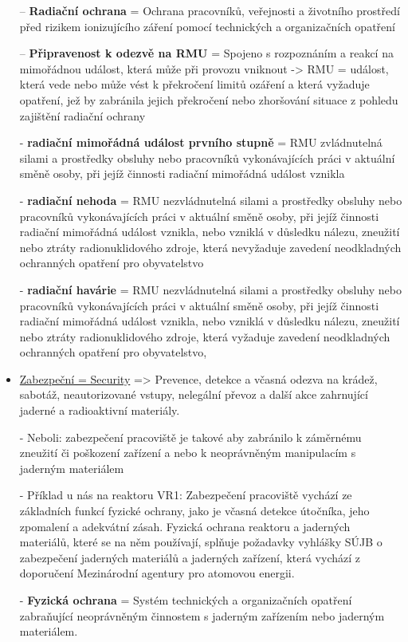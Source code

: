 \begin{itemize}
    \noindent --	\textbf{Radiační ochrana} = Ochrana pracovníků, veřejnosti a životního prostředí před rizikem ionizujícího záření pomocí technických a organizačních opatření


    \noindent --	\textbf{Připravenost k odezvě na RMU} = Spojeno s rozpoznáním a reakcí na mimořádnou událost, která může při provozu vniknout ->  RMU = událost, která vede nebo může vést k překročení limitů ozáření a která vyžaduje opatření, jež by zabránila jejich překročení nebo zhoršování situace z pohledu zajištění radiační ochrany

    - \textbf{radiační mimořádná událost prvního stupně} = RMU zvládnutelná silami a prostředky obsluhy nebo pracovníků vykonávajících práci v aktuální směně osoby, při jejíž činnosti radiační mimořádná událost vznikla

- \textbf{radiační nehoda} = RMU nezvládnutelná silami a prostředky obsluhy nebo pracovníků vykonávajících práci v aktuální směně osoby, při jejíž činnosti radiační mimořádná událost vznikla, nebo vzniklá v důsledku nálezu, zneužití nebo ztráty radionuklidového zdroje, která nevyžaduje zavedení neodkladných ochranných opatření pro obyvatelstvo

- \textbf{radiační havárie} = RMU nezvládnutelná silami a prostředky obsluhy nebo pracovníků vykonávajících práci v aktuální směně osoby, při jejíž činnosti radiační mimořádná událost vznikla, nebo vzniklá v důsledku nálezu, zneužití nebo ztráty radionuklidového zdroje, která vyžaduje zavedení neodkladných ochranných opatření pro obyvatelstvo,

    \item \underline{Zabezpeční = Security} => Prevence, detekce a včasná odezva na krádež, sabotáž, neautorizované vstupy, nelegální převoz a další akce zahrnující jaderné a radioaktivní materiály.
    
    - Neboli: zabezpečení pracoviště je takové aby zabránilo k záměrnému zneužití či poškození zařízení a nebo k neoprávněným manipulacím s jaderným materiálem

    - Příklad u nás na reaktoru VR1: Zabezpečení pracoviště vychází ze základních funkcí fyzické ochrany, jako je včasná detekce útočníka, jeho zpomalení a adekvátní zásah. Fyzická ochrana reaktoru a jaderných materiálů, které se na něm používají, splňuje požadavky vyhlášky SÚJB o zabezpečení jaderných materiálů a jaderných zařízení, která vychází z doporučení Mezinárodní agentury pro atomovou energii.


    \noindent - \textbf{Fyzická ochrana} = Systém technických a organizačních opatření zabraňující neoprávněným činnostem s jaderným zařízením nebo jaderným materiálem.


\end{itemize}
